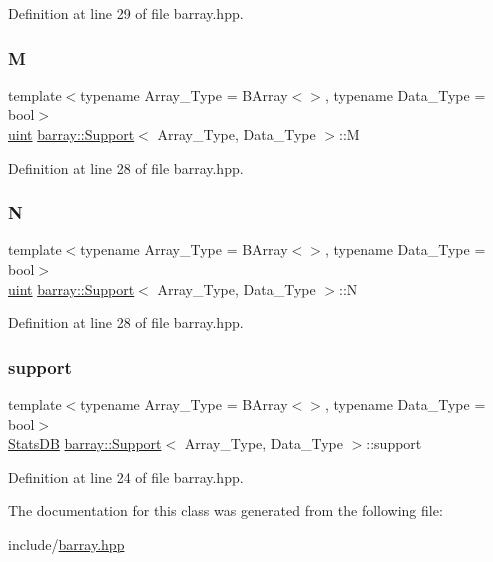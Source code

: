 Definition at line 29 of file barray.\+hpp.

\mbox{\label{classbarray_1_1_support_a8adc9270abedbe8a49c6e25f0b14640d}} 
\subsubsection{\texorpdfstring{M}{M}}
{\footnotesize\ttfamily template$<$typename Array\+\_\+\+Type  = B\+Array$<$$>$, typename Data\+\_\+\+Type  = bool$>$ \\
\hyperlink{namespacebarray_af9756a31953db233f80a9cfe1ef31c32}{uint} \hyperlink{classbarray_1_1_support}{barray\+::\+Support}$<$ Array\+\_\+\+Type, Data\+\_\+\+Type $>$\+::M}



Definition at line 28 of file barray.\+hpp.

\mbox{\label{classbarray_1_1_support_aecfa544ce5307fa5bf05b938c957a79e}} 
\subsubsection{\texorpdfstring{N}{N}}
{\footnotesize\ttfamily template$<$typename Array\+\_\+\+Type  = B\+Array$<$$>$, typename Data\+\_\+\+Type  = bool$>$ \\
\hyperlink{namespacebarray_af9756a31953db233f80a9cfe1ef31c32}{uint} \hyperlink{classbarray_1_1_support}{barray\+::\+Support}$<$ Array\+\_\+\+Type, Data\+\_\+\+Type $>$\+::N}



Definition at line 28 of file barray.\+hpp.

\mbox{\label{classbarray_1_1_support_a5c509beff6f44ff560179180ceaf6fd3}} 
\subsubsection{\texorpdfstring{support}{support}}
{\footnotesize\ttfamily template$<$typename Array\+\_\+\+Type  = B\+Array$<$$>$, typename Data\+\_\+\+Type  = bool$>$ \\
\hyperlink{classbarray_1_1_stats_d_b}{Stats\+DB} \hyperlink{classbarray_1_1_support}{barray\+::\+Support}$<$ Array\+\_\+\+Type, Data\+\_\+\+Type $>$\+::support}



Definition at line 24 of file barray.\+hpp.



The documentation for this class was generated from the following file\+:\begin{DoxyCompactItemize}
\item 
include/\hyperlink{barray_8hpp}{barray.\+hpp}\end{DoxyCompactItemize}
